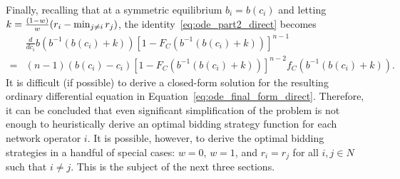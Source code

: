 Finally, recalling that at a symmetric equilibrium $b_i=b(c_i)$ and letting $k=\nobreak\frac{(1-w)}{w}(r_i-\min_{j\neq i}r_j)$, the identity~\eqref{eq:ode_part2_direct} becomes
\begin{align}
	\label{eq:ode_final_form_direct}
	&\frac{d}{dc_i}b\left( b^{-1}(b(c_i) + k) \right) \left[ 1 - F_C(b^{-1}(b(c_i)+k)) \right]^{n-1} \nonumber\\
	= &(n-1)(b(c_i)-c_i)\left[ 1 - F_C(b^{-1}(b(c_i)+k)) \right]^{n-2} f_C(b^{-1}(b(c_i)+k)).
\end{align}
It is difficult (if possible) to derive a closed-form solution for the resulting ordinary differential equation in Equation~\eqref{eq:ode_final_form_direct}. Therefore, it can be concluded that even significant simplification of the problem is not enough to heuristically derive an optimal bidding strategy function for each network operator $i$. It is possible, however, to derive the optimal bidding strategies in a handful of special cases: $w=0$, $w=1$, and $r_i=r_j$ for all $i,j\in N$ such that $i\neq j$. This is the subject of the next three sections.

